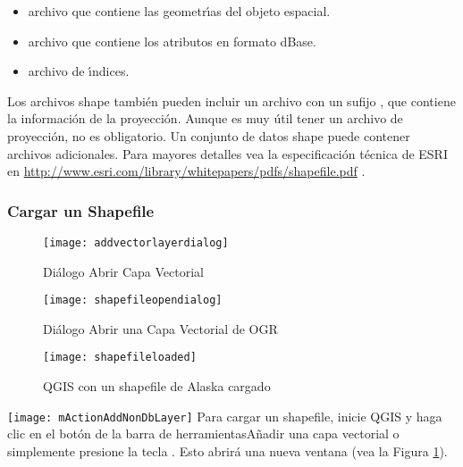 \begin{itemize}
\item {} archivo que contiene las geometr\'{\i}as del objeto espacial.
\item {} archivo que contiene los atributos en formato dBase.
\item {} archivo de \'{\i}ndices.
\end{itemize}

Los archivos shape también pueden incluir un archivo con un sufijo , que contiene la informaci\'on de la proyecci\'on. Aunque es muy \'util tener un archivo de proyecci\'on, no es obligatorio. Un conjunto de datos shape puede contener archivos adicionales. Para mayores detalles vea la especificaci\'on t\'ecnica de ESRI en  \url{http://www.esri.com/library/whitepapers/pdfs/shapefile.pdf}
.

\subsubsection{Cargar un Shapefile}\label{sec:load_shapefile}

\begin{figure}[ht]
   \begin{center}
   \caption{Di\'alogo Abrir Capa Vectorial \nixcaption}\label{fig:addvectorlayer}\smallskip
   \texttt{[image: addvectorlayerdialog]}
\end{center} 
\end{figure}

\begin{figure}[ht]
   \begin{center}
   \caption{Di\'alogo Abrir una Capa Vectorial de OGR \nixcaption}\label{fig:openshapefile}\smallskip
   \texttt{[image: shapefileopendialog]}
\end{center} 
\end{figure}

\begin{figure}[ht]
   \begin{center}
   \caption{QGIS con un shapefile de Alaska cargado \nixcaption}\label{fig:loadedshapefile}\smallskip
   \texttt{[image: shapefileloaded]}
\end{center} 
\end{figure}

\texttt{[image: mActionAddNonDbLayer]} Para cargar un shapefile, inicie
QGIS y haga clic en el bot\'on  de la barra de herramientas{A\~nadir una capa vectorial}
 o simplemente presione la tecla . Esto abrir\'a una nueva ventana (vea la Figura \ref{fig:addvectorlayer}).  

